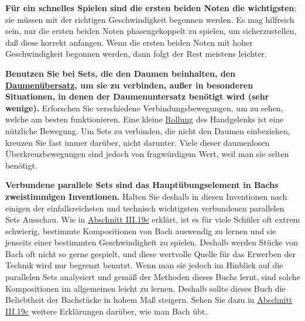\textbf{Für ein schnelles Spielen sind die ersten beiden Noten die wichtigsten}; sie müssen mit der richtigen Geschwindigkeit begonnen werden.
Es mag hilfreich sein, nur die ersten beiden Noten phasengekoppelt zu spielen, um sicherzustellen, daß diese korrekt anfangen.
Wenn die ersten beiden Noten mit hoher Geschwindigkeit begonnen werden, dann folgt der Rest meistens leichter.

\textbf{Benutzen Sie bei Sets, die den Daumen beinhalten, den \hyperlink{c1iii5a}{Daumenübersatz}, um sie zu verbinden, außer in besonderen Situationen, in denen der Daumenuntersatz benötigt wird (sehr wenige).}
Erforschen Sie verschiedene Verbindungsbewegungen, um zu sehen, welche am besten funktionieren.
Eine kleine \hyperlink{Rollung}{Rollung} des Handgelenks ist eine nützliche Bewegung.
Um Sets zu verbinden, die nicht den Daumen einbeziehen, kreuzen Sie fast immer darüber, nicht darunter.
Viele dieser daumenlosen Überkreuzbewegungen sind jedoch von fragwürdigem Wert, weil man sie selten benötigt.

\textbf{Verbundene parallele Sets sind das Hauptübungselement in Bachs zweistimmigen Inventionen.}
Halten Sie deshalb in diesen Inventionen nach einigen der einfallsreichsten und technisch wichtigsten verbundenen parallelen Sets Ausschau.
Wie in \hyperlink{c1iii19c}{Abschnitt III.19c} erklärt, ist es für viele Schüler oft extrem schwierig, bestimmte Kompositionen von Bach auswendig zu lernen und sie jenseits einer bestimmten Geschwindigkeit zu spielen.
Deshalb werden Stücke von Bach oft nicht so gerne gespielt, und diese wertvolle Quelle für das Erwerben der Technik wird nur begrenzt benutzt.
Wenn man sie jedoch im Hinblick auf die parallelen Sets analysiert und gemäß der Methoden dieses Buchs lernt, sind solche Kompositionen im allgemeinen leicht zu lernen.
Deshalb sollte dieses Buch die Beliebtheit der Bachstücke in hohem Maß steigern.
Sehen Sie dazu in \hyperlink{c1iii19c}{Abschnitt III.19c} weitere Erklärungen darüber, wie man Bach übt.

